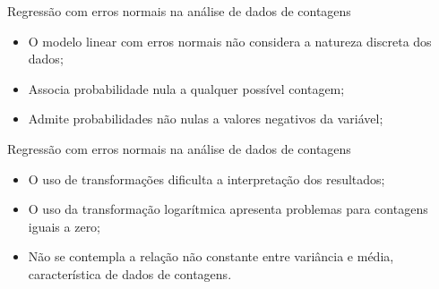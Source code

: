 \documentclass[10pt, aspectratio=169]{beamer}
\begin{document}


\begin{frame}{Regressão com erros normais na análise de dados de contagens}
    
    \vspace{0,5cm}
    
    \begin{itemize}
        \item O modelo linear com erros normais não considera a natureza discreta dos dados;
        
        \vspace{0,5cm}
        
        \item Associa probabilidade nula a qualquer possível contagem;
        
        \vspace{0,5cm}
        
        \item Admite probabilidades não nulas a valores negativos da variável;
       
    \end{itemize}
    
\end{frame}




\begin{frame}{Regressão com erros normais na análise de dados de contagens}
    
    
    \vspace{0,2cm}
    
    \begin{itemize}
 
        \item O uso de transformações dificulta a interpretação dos resultados;
        
        \vspace{0,5cm}
        
        \item O uso da transformação logarítmica apresenta problemas para contagens iguais a zero;
        
        \vspace{0,5cm}
        
        \item Não se contempla a relação não constante entre variância e média, característica de  dados de contagens.
        
        
    \end{itemize}
    
\end{frame}
\end{document}

